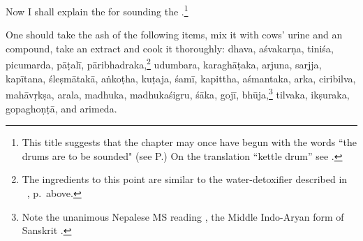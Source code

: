 \begin{translation}
    
    \item[1] Now I shall explain the  for
sounding the .\footnote{This title
    suggests that the chapter may once have begun with the words “the
    drums are to be sounded" (see P.) On the translation “kettle
    drum” see \cites[318]{hopk-1889}{ross-2014}.}
    
    \item[3] One should take the ash of the following items, mix it
with cows' urine and an  compound, take an
extract and cook it thoroughly: %
\gls{dhava}, \gls{aśvakarṇa}, \gls{tiniśa}, \gls{picumarda},
\gls{pāṭalī}, \gls{pāribhadraka},\footnote{\label{drum-detox}The
    ingredients to this point are similar to the water-detoxifier
    described in \SS\ , p.\,\pageref{water-detox}
    above.} \gls{udumbara}, \gls{karaghāṭaka}, \gls{arjuna},
    \gls{sarjja}, \gls{kapītana}, \gls{śleṣmātakā}, \gls{aṅkoṭha},
    \gls{kuṭaja}, \gls{śamī}, \gls{kapittha}, \gls{aśmantaka},
    \gls{arka}, \gls{ciribilva}, \gls{mahāvṛkṣa}, \gls{arala},
    \gls{madhuka}, \gls{madhukaśigru}, \gls{śāka}, \gls{gojī},
    \gls{bhūja},\footnote{Note the unanimous Nepalese MS reading
        , the Middle Indo-Aryan form of Sanskrit 
        \citep[\#9570]{CDIAL}.} \gls{tilvaka}, \gls{ikṣuraka},
        \gls{gopaghoṇṭā}, and \gls{arimeda}.
     

\end{translation}
